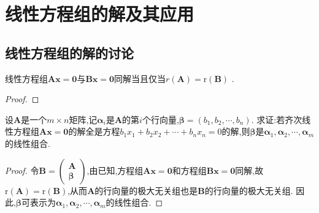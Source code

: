 \documentclass[../../main.tex]{subfiles}
\begin{document}
\section{线性方程组的解及其应用}

\subsection{线性方程组的解的讨论}

\begin{proposition}\label{proposition:线性方程组同解系数矩阵秩相同}
线性方程组$\boldsymbol{Ax}=\mathbf{0}$与$\boldsymbol{Bx}=\mathbf{0}$同解当且仅当$r\left( \boldsymbol{A} \right) =\mathrm{r}\left( \boldsymbol{B} \right)$ .
\end{proposition}
\begin{proof}

\end{proof}

\begin{example}
设\(\boldsymbol{A}\)是一个\(m\times n\)矩阵,记\(\boldsymbol{\alpha}_i\)是\(\boldsymbol{A}\)的第\(i\)个行向量,\(\boldsymbol{\beta}=(b_1,b_2,\cdots,b_n)\). 求证:若齐次线性方程组\(\boldsymbol{A}\boldsymbol{x}=\boldsymbol{0}\)的解全是方程\(b_1x_1 + b_2x_2+\cdots + b_nx_n = 0\)的解,则\(\boldsymbol{\beta}\)是\(\boldsymbol{\alpha}_1,\boldsymbol{\alpha}_2,\cdots,\boldsymbol{\alpha}_m\)的线性组合.
\end{example}
\begin{proof}
令\(\boldsymbol{B}=\begin{pmatrix}
\boldsymbol{A}\\
\boldsymbol{\beta}
\end{pmatrix}\),由已知,方程组\(\boldsymbol{A}\boldsymbol{x}=\boldsymbol{0}\)和方程组\(\boldsymbol{B}\boldsymbol{x}=\boldsymbol{0}\)同解,故\(\mathrm{r}(\boldsymbol{A})=\mathrm{r}(\boldsymbol{B})\),从而\(\boldsymbol{A}\)的行向量的极大无关组也是\(\boldsymbol{B}\)的行向量的极大无关组. 因此,\(\boldsymbol{\beta}\)可表示为\(\boldsymbol{\alpha}_1,\boldsymbol{\alpha}_2,\cdots,\boldsymbol{\alpha}_m\)的线性组合. 
\end{proof}
\end{document}
